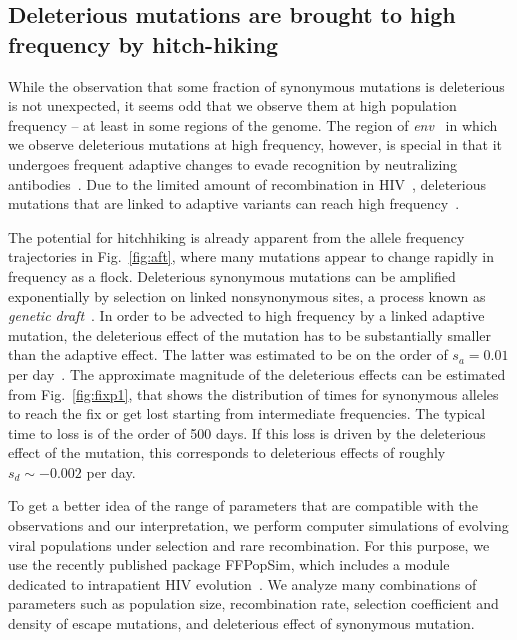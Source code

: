 \documentclass[rmp, twocolumn]{revtex4}
\newcommand{\FIG}[1]{Fig.~\ref{fig:#1}}
\newcommand{\env}{\textit{env}}
\begin{document}
\subsection{Deleterious mutations are brought to high frequency by hitch-hiking}

While the observation that some fraction of synonymous mutations is deleterious
is not unexpected, it seems odd that we observe them at high population
frequency -- at least in some regions of the genome. The region of \env~ in
which we observe deleterious mutations at high frequency, however, is special in
that it undergoes frequent adaptive changes to evade recognition by neutralizing
antibodies~\cite{williamson_adaptation_2003}. Due to the limited amount of
recombination in HIV~\cite{neher_recombination_2010,batorsky_estimate_2011},
deleterious mutations that are linked to adaptive variants can reach high
frequency~\citep{smith_hitch-hiking_1974}.

The potential for hitchhiking is already apparent from the allele frequency
trajectories in \FIG{aft}, where many mutations appear to change rapidly in
frequency as a flock. Deleterious synonymous mutations can be amplified
exponentially by selection on linked nonsynonymous sites, a process known as
{\it genetic draft}~\citep{gillespie_genetic_2000, neher_genetic_2011}. In order
to be advected to high frequency by a linked adaptive mutation, the deleterious
effect of the mutation has to be substantially smaller than the adaptive effect.
The latter was estimated to be on the order of $s_a = 0.01$ per day~\citep{neher_recombination_2010}.
The approximate magnitude of the deleterious effects can be estimated from
\FIG{fixp1}, that shows the distribution of times for synonymous
alleles to reach the fix or get lost starting from intermediate frequencies. The
typical time to loss is of the order of 500 days. If this loss is driven by the
deleterious effect of the mutation, this corresponds to deleterious effects of
roughly $s_d \sim - 0.002$ per day.

To get a better idea of the range of parameters that are compatible with the
observations and our interpretation, we perform computer simulations of
evolving viral populations under selection and rare recombination. For this
purpose, we use the recently published package FFPopSim, which includes a module
dedicated to intrapatient HIV evolution~\citep{zanini_ffpopsim:_2012}. We
analyze many combinations of parameters such as population size, recombination
rate, selection coefficient and density of escape mutations, and deleterious effect
of synonymous mutation.
\end{document}
